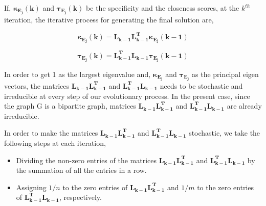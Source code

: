 If, $\mathbf{\kappa_{E_{j}}(k)}$ and $\mathbf{\tau_{E_{j}}(k)}$ be the specificity and the closeness scores, at the $k^{th}$ iteration, the iterative process for generating the final solution are,

\begin{equation}
\label{eq1}
\mathbf{\kappa_{E_{j}}(k)} = \mathbf{L_{k-1}L^{T}_{k-1}}\mathbf{\kappa_{E_{j}}(k-1)} 
\end{equation}

\begin{equation}
\label{eq2}
\mathbf{\tau_{E_{j}}(k)} = \mathbf{L^{T}_{k-1}L_{k-1}}\mathbf{\tau_{E_{j}}(k-1)}
\end{equation}

In order to get 1 as the largest eigenvalue and, $\mathbf{\kappa_{E_{j}}} $ and $\mathbf{\tau_{E_{j}}}$ as the principal eigen vectors, the matrices $\mathbf{L_{k-1}L^{T}_{k-1}}$ and $\mathbf{L^{T}_{k-1}L_{k-1}}$ needs to be stochastic and irreducible \cite{langville2004deeper} at every step of our evolutionary process.  In the present case, since the graph G is a bipartite graph, matrices $\mathbf{L_{k-1}L^{T}_{k-1}}$ and $\mathbf{L^{T}_{k-1}L_{k-1}}$ are already irreducible.







In order to make the matrices $\mathbf{L_{k-1}L^{T}_{k-1}}$ and $\mathbf{L^{T}_{k-1}L_{k-1}}$ stochastic, we take the following steps at each iteration,


\begin{itemize}
  \item Dividing the non-zero entries of the matrices  $\mathbf{L_{k-1}L^{T}_{k-1}}$ and $\mathbf{L^{T}_{k-1}L_{k-1}}$ by the summation of all the entries in a row. 


  \item Assigning $1/n$ to the zero entries of $\mathbf{L_{k-1}L^{T}_{k-1}}$ and $1/m$ to the zero entries of $\mathbf{L^{T}_{k-1}L_{k-1}}$, respectively.
\end{itemize}

